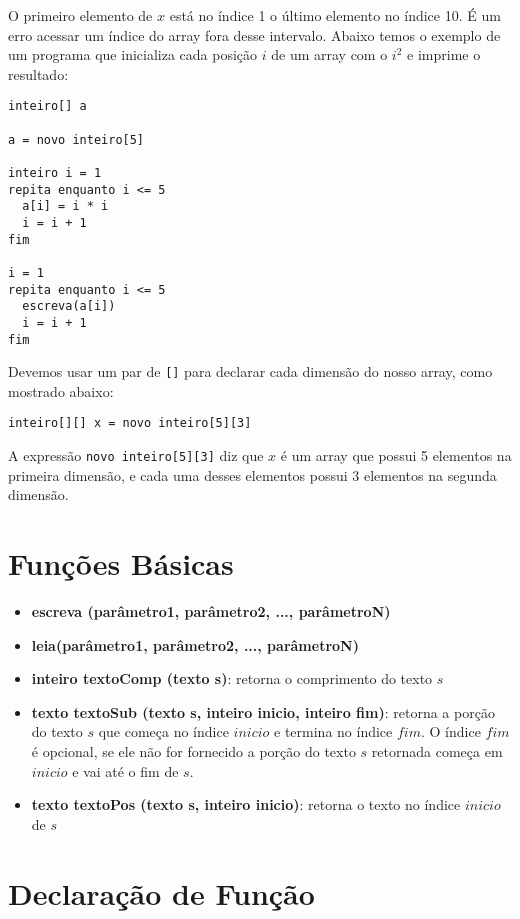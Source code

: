 \documentclass{report}
\begin{document}
O primeiro elemento de $x$ está no índice 1 o último
elemento no índice 10. É um erro acessar um índice do
array fora desse intervalo. Abaixo temos o exemplo de
um programa que inicializa cada posição $i$ de um array
com o $i^2$ e imprime o resultado:
\begin{verbatim}
inteiro[] a

a = novo inteiro[5]

inteiro i = 1
repita enquanto i <= 5
  a[i] = i * i
  i = i + 1
fim

i = 1
repita enquanto i <= 5
  escreva(a[i])
  i = i + 1
fim
\end{verbatim}


Devemos usar um par de \texttt{[]} para declarar cada dimensão
do nosso array, como mostrado abaixo: 
\begin{verbatim}
inteiro[][] x = novo inteiro[5][3]
\end{verbatim}

A expressão \texttt{novo inteiro[5][3]} diz que $x$ é um
array que possui 5 elementos na primeira dimensão, e cada
uma desses elementos possui 3 elementos na segunda dimensão.


\section{Funções Básicas}

\begin{itemize}
	\item \textbf{escreva (parâmetro1, parâmetro2, ..., parâmetroN)}
	
	\item \textbf{leia(parâmetro1, parâmetro2, ..., parâmetroN)}
	
	\item \textbf{inteiro textoComp (texto s)}: retorna o comprimento do texto $s$
	
	\item \textbf{texto textoSub (texto s, inteiro inicio, inteiro fim)}:
	retorna a porção do texto $s$ que começa no índice $inicio$ e termina
  no índice $fim$. O índice $fim$ é opcional, se ele não for fornecido a
  porção do texto $s$ retornada começa em $inicio$ e vai até o fim de $s$.
	
	\item \textbf{texto textoPos (texto s, inteiro inicio)}:
	retorna o texto no índice $inicio$ de $s$
\end{itemize}


\section{Declaração de Função}
\end{document}
